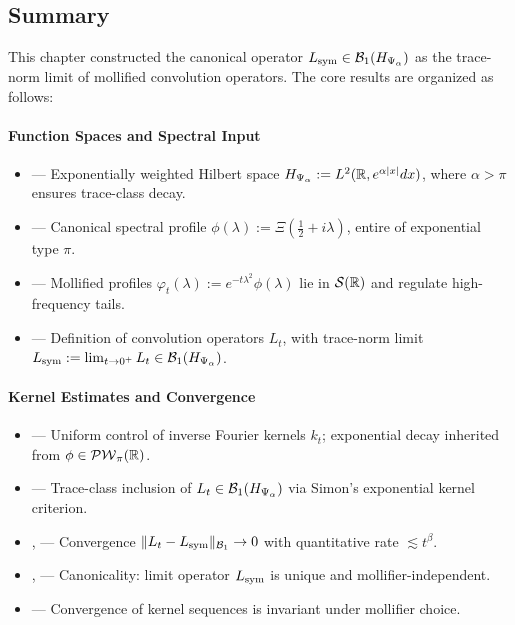\subsection*{Summary}

This chapter constructed the canonical operator \( L_{\mathrm{sym}} \in \mathcal{B}_1(H_{\Psi_\alpha}) \) as the trace-norm limit of mollified convolution operators. The core results are organized as follows:

\paragraph{Function Spaces and Spectral Input}
\begin{itemize}
  \item {} — Exponentially weighted Hilbert space \( H_{\Psi_\alpha} := L^2(\mathbb{R}, e^{\alpha |x|} dx) \), where \( \alpha > \pi \) ensures trace-class decay.
  \item {} — Canonical spectral profile \( \phi(\lambda) := \Xi(\tfrac{1}{2} + i\lambda) \), entire of exponential type \( \pi \).
  \item {} — Mollified profiles \( \varphi_t(\lambda) := e^{-t\lambda^2} \phi(\lambda) \) lie in \( \mathcal{S}(\mathbb{R}) \) and regulate high-frequency tails.
  \item {} — Definition of convolution operators \( L_t \), with trace-norm limit \( L_{\mathrm{sym}} := \lim_{t \to 0^+} L_t \in \mathcal{B}_1(H_{\Psi_\alpha}) \).
\end{itemize}

\paragraph{Kernel Estimates and Convergence}
\begin{itemize}
  \item {} — Uniform control of inverse Fourier kernels \( k_t \); exponential decay inherited from \( \phi \in \mathcal{PW}_{\pi}(\mathbb{R}) \).
  \item {} — Trace-class inclusion of \( L_t \in \mathcal{B}_1(H_{\Psi_\alpha}) \) via Simon's exponential kernel criterion.
  \item {},  — Convergence \( \|L_t - L_{\mathrm{sym}}\|_{\mathcal{B}_1} \to 0 \) with quantitative rate \( \lesssim t^\beta \).
  \item {},  — Canonicality: limit operator \( L_{\mathrm{sym}} \) is unique and mollifier-independent.
  \item {} — Convergence of kernel sequences is invariant under mollifier choice.
\end{itemize}

